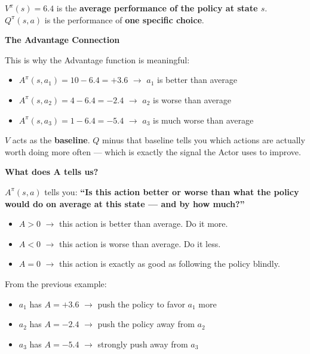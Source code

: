 $V^\pi(s) = 6.4$ is the \textbf{average performance of the policy at state $s$}. $Q^\pi(s, a)$ is the performance of \textbf{one specific choice}.

\medskip

\textbf{The Advantage Connection}

This is why the Advantage function is meaningful:

\begin{itemize}
    \item $A^\pi(s, a_1) = 10 - 6.4 = \mathbf{+3.6}$ $\to$ $a_1$ is better than average
    \item $A^\pi(s, a_2) = 4 - 6.4 = \mathbf{-2.4}$ $\to$ $a_2$ is worse than average
    \item $A^\pi(s, a_3) = 1 - 6.4 = \mathbf{-5.4}$ $\to$ $a_3$ is much worse than average
\end{itemize}

$V$ acts as the \textbf{baseline}. $Q$ minus that baseline tells you which actions are actually worth doing more often --- which is exactly the signal the Actor uses to improve.

\bigskip


\textbf{What does A tells us?}

\medskip

$A^\pi(s, a)$ tells you: \textbf{``Is this action better or worse than what the policy would do on average at this state --- and by how much?''}

\begin{itemize}
    \item $A > 0$ $\to$ this action is better than average. Do it more.
    \item $A < 0$ $\to$ this action is worse than average. Do it less.
    \item $A = 0$ $\to$ this action is exactly as good as following the policy blindly.
\end{itemize}

From the previous example:

\begin{itemize}
    \item $a_1$ has $A = +3.6$ $\to$ push the policy to favor $a_1$ more
    \item $a_2$ has $A = -2.4$ $\to$ push the policy away from $a_2$
    \item $a_3$ has $A = -5.4$ $\to$ strongly push away from $a_3$
\end{itemize}

